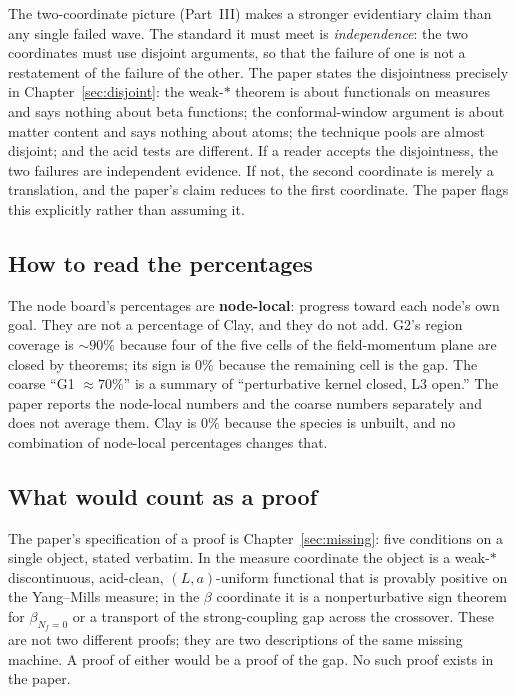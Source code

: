 The two-coordinate picture (Part~III) makes a stronger evidentiary claim than any single failed
wave. The standard it must meet is \emph{independence}: the two coordinates must use disjoint
arguments, so that the failure of one is not a restatement of the failure of the other. The paper
states the disjointness precisely in Chapter~\ref{sec:disjoint}: the weak-$*$ theorem is about
functionals on measures and says nothing about beta functions; the conformal-window argument is
about matter content and says nothing about atoms; the technique pools are almost disjoint; and
the acid tests are different. If a reader accepts the disjointness, the two failures are
independent evidence. If not, the second coordinate is merely a translation, and the paper's
claim reduces to the first coordinate. The paper flags this explicitly rather than assuming it.

\subsection{How to read the percentages}

The node board's percentages are \textbf{node-local}: progress toward each node's own goal.
They are not a percentage of Clay, and they do not add. G2's region coverage is $\sim90\%$
because four of the five cells of the field-momentum plane are closed by theorems; its sign is
$0\%$ because the remaining cell is the gap. The coarse ``G1 $\approx70\%$'' is a summary of
``perturbative kernel closed, L3 open.'' The paper reports the node-local numbers and the coarse
numbers separately and does not average them. Clay is $0\%$ because the species is unbuilt, and
no combination of node-local percentages changes that.

\subsection{What would count as a proof}

The paper's specification of a proof is Chapter~\ref{sec:missing}: five conditions on a single
object, stated verbatim. In the measure coordinate the object is a weak-$*$ discontinuous,
acid-clean, $(L,a)$-uniform functional that is provably positive on the Yang--Mills measure; in
the $\beta$ coordinate it is a nonperturbative sign theorem for $\beta_{N_f=0}$ or a transport of
the strong-coupling gap across the crossover. These are not two different proofs; they are two
descriptions of the same missing machine. A proof of either would be a proof of the gap. No such
proof exists in the paper.
